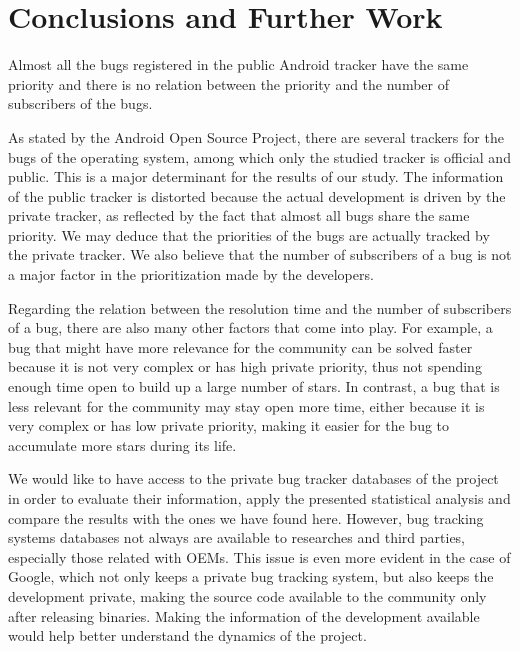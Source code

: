 \documentclass[10pt, conference, compsocconf]{IEEEtran}
\begin{document}

\section{Conclusions and Further Work}
Almost all the bugs registered in the public Android tracker have the same priority and there is no relation between the priority and the number of subscribers of the bugs.

As stated by the Android Open Source Project, there are several trackers for the bugs of the operating system, among which only the studied tracker is official and public. This is a major determinant for the results of our study. The information of the public tracker is distorted because the actual development is driven by the private tracker, as reflected by the fact that almost all bugs share the same priority. We may deduce that the priorities of the bugs are actually tracked by the private tracker. We also believe that the number of subscribers of a bug is not a major factor in the prioritization made by the developers.

Regarding the relation between the resolution time and the number of subscribers of a bug, there are also many other factors that come into play. For example, a bug that might have more relevance for the community can be solved faster because it is not very complex or has high private priority, thus not spending enough time open to build up a large number of stars. In contrast, a bug that is less relevant for the community may stay open more time, either because it is very complex or has low private priority, making it easier for the bug to accumulate more stars during its life.

We would like to have access to the private bug tracker databases of the project in order to evaluate their information, apply the presented statistical analysis and compare the results with the ones we have found here. However, bug tracking systems databases not always are available to researches and third parties, especially those related with OEMs. This issue is even more evident in the case of Google, which not only keeps a private bug tracking system, but also keeps the development private, making the source code available to the community only after releasing binaries. Making the information of the development available would help better  understand the dynamics of the project.
\end{document}
